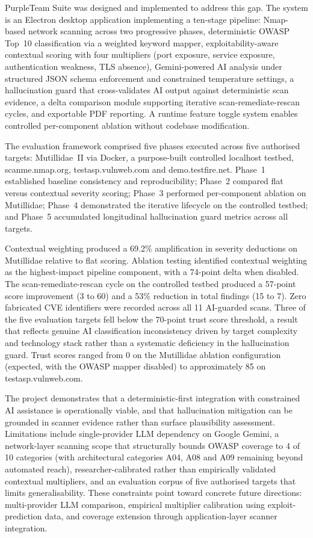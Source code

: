 \documentclass[12pt, a4paper, oneside]{report}
\begin{document}
PurpleTeam Suite was designed and implemented to address this gap. The system is an Electron desktop application implementing a ten-stage pipeline: Nmap-based network scanning across two progressive phases, deterministic OWASP Top~10 classification via a weighted keyword mapper, exploitability-aware contextual scoring with four multipliers (port exposure, service exposure, authentication weakness, TLS absence), Gemini-powered AI analysis under structured JSON schema enforcement and constrained temperature settings, a hallucination guard that cross-validates AI output against deterministic scan evidence, a delta comparison module supporting iterative scan-remediate-rescan cycles, and exportable PDF reporting. A runtime feature toggle system enables controlled per-component ablation without codebase modification.

The evaluation framework comprised five phases executed across five authorised targets: Mutillidae~II via Docker, a purpose-built controlled localhost testbed, scanme.nmap.org, testasp.vulnweb.com and demo.testfire.net. Phase~1 established baseline consistency and reproducibility; Phase~2 compared flat versus contextual severity scoring; Phase~3 performed per-component ablation on Mutillidae; Phase~4 demonstrated the iterative lifecycle on the controlled testbed; and Phase~5 accumulated longitudinal hallucination guard metrics across all targets.

Contextual weighting produced a 69.2\% amplification in severity deductions on Mutillidae relative to flat scoring. Ablation testing identified contextual weighting as the highest-impact pipeline component, with a 74-point delta when disabled. The scan-remediate-rescan cycle on the controlled testbed produced a 57-point score improvement (3 to 60) and a 53\% reduction in total findings (15 to 7). Zero fabricated CVE identifiers were recorded across all 11 AI-guarded scans. Three of the five evaluation targets fell below the 70-point trust score threshold, a result that reflects genuine AI classification inconsistency driven by target complexity and technology stack rather than a systematic deficiency in the hallucination guard. Trust scores ranged from 0 on the Mutillidae ablation configuration (expected, with the OWASP mapper disabled) to approximately 85 on testasp.vulnweb.com.

The project demonstrates that a deterministic-first integration with constrained AI assistance is operationally viable, and that hallucination mitigation can be grounded in scanner evidence rather than surface plausibility assessment. Limitations include single-provider LLM dependency on Google Gemini, a network-layer scanning scope that structurally bounds OWASP coverage to 4 of 10 categories (with architectural categories A04, A08 and A09 remaining beyond automated reach), researcher-calibrated rather than empirically validated contextual multipliers, and an evaluation corpus of five authorised targets that limits generalisability. These constraints point toward concrete future directions: multi-provider LLM comparison, empirical multiplier calibration using exploit-prediction data, and coverage extension through application-layer scanner integration.
\end{document}
